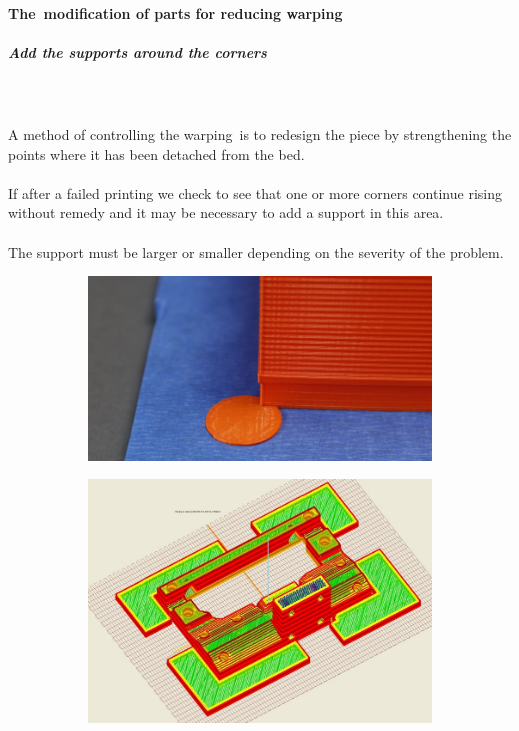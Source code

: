 \documentclass[11pt,a4paper]{article}
\begin{document}
			\paragraph{The modification of parts for reducing warping}
				\subparagraph{Add the supports around the corners}\mbox{}\\\\
A method of controlling the warping is to redesign the piece by strengthening the points where it has been detached from the bed.
\\\\
If after a failed printing we check to see that one or more corners continue rising without remedy and it may be necessary to add a support in this area.
\\\\
The support must be larger or smaller depending on the severity of the problem.
\begin{figure}[H]
    \centering
    \begin{subfigure}[b]{0.4\textwidth}
        \includegraphics[width=\textwidth,cfbox=azul_marcos 4pt 0pt]{FOTOS/MOUSEEAR1}
    \end{subfigure}
    \qquad %
    \begin{subfigure}[b]{0.4\textwidth}
        \includegraphics[width=\textwidth,cfbox=azul_marcos 4pt 0pt]{FOTOS/MOUSEEAR2}
    \end{subfigure}   
\end{figure}	
\end{document}
